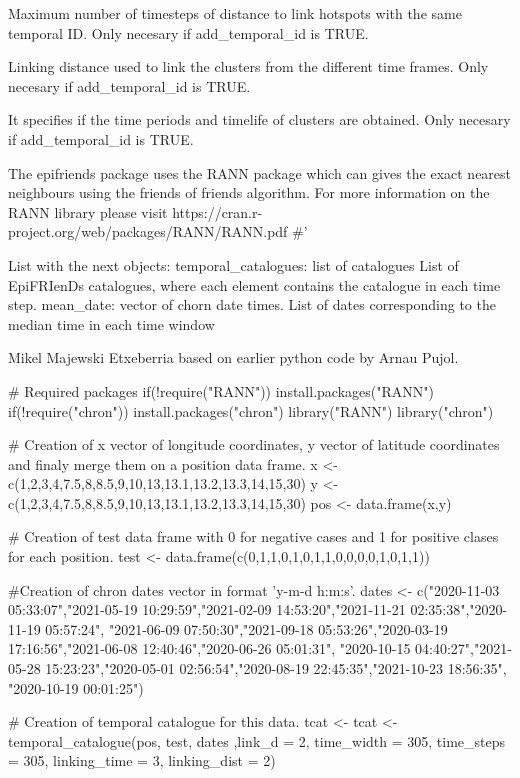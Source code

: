 \documentclass[a4paper]{book}
\begin{document}
\begin{Arguments}
\begin{ldescription}
\item[\code{linking\_time}] Maximum number of timesteps of distance to link hotspots with the same temporal ID. Only necesary if add\_temporal\_id is TRUE.

\item[\code{linking\_dist}] Linking distance used to link the clusters from the different time frames. Only necesary if add\_temporal\_id is TRUE.

\item[\code{get\_timelife}] It specifies if the time periods and timelife of clusters are obtained. Only necesary if add\_temporal\_id is TRUE.
\end{ldescription}
\end{Arguments}
%
\begin{Details}\relax
The epifriends package uses the RANN package which can gives the exact nearest neighbours using the friends of friends algorithm. For more information on the RANN library please visit https://cran.r-project.org/web/packages/RANN/RANN.pdf
\#'
\end{Details}
%
\begin{Value}
List with the next objects:
temporal\_catalogues: list of catalogues
List of EpiFRIenDs catalogues, where each element contains the catalogue in each
time step.
mean\_date: vector of chorn date times.
List of dates corresponding to the median time in each time window
\end{Value}
%
\begin{Author}\relax
Mikel Majewski Etxeberria based on earlier python code by Arnau Pujol.
\end{Author}
%
\begin{Examples}
\begin{ExampleCode}
# Required packages
if(!require("RANN")) install.packages("RANN")
if(!require("chron")) install.packages("chron")
library("RANN")
library("chron")

# Creation of x vector of longitude coordinates, y vector of latitude coordinates and finaly merge them on a position data frame.
x <- c(1,2,3,4,7.5,8,8.5,9,10,13,13.1,13.2,13.3,14,15,30)
y <- c(1,2,3,4,7.5,8,8.5,9,10,13,13.1,13.2,13.3,14,15,30)
pos <- data.frame(x,y)

# Creation of test data frame with 0 for negative cases and 1 for positive clases for each position.
test <- data.frame(c(0,1,1,0,1,0,1,1,0,0,0,0,1,0,1,1))

#Creation of chron dates vector in format 'y-m-d h:m:s'.
dates <- c("2020-11-03 05:33:07","2021-05-19 10:29:59","2021-02-09 14:53:20","2021-11-21 02:35:38","2020-11-19 05:57:24",
"2021-06-09 07:50:30","2021-09-18 05:53:26","2020-03-19 17:16:56","2021-06-08 12:40:46","2020-06-26 05:01:31",
"2020-10-15 04:40:27","2021-05-28 15:23:23","2020-05-01 02:56:54","2020-08-19 22:45:35","2021-10-23 18:56:35",
"2020-10-19 00:01:25")

# Creation of temporal catalogue for this data.
tcat <- tcat <- temporal_catalogue(pos, test, dates ,link_d = 2, time_width = 305, time_steps = 305, linking_time = 3, linking_dist = 2)
\end{ExampleCode}
\end{Examples}
\printindex{}
\end{document}
